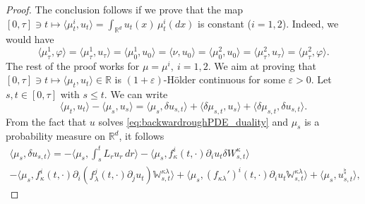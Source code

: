 \documentclass[10pt, a4paper]{article} %
\newcommand{\R}{\mathbb{R}}
\theoremstyle{definition}
\theoremstyle{plain}
\begin{document}
\begin{proof}

    The conclusion follows if we prove that the map $[0,\tau] \ni t \mapsto \langle \mu^i_t, u_t \rangle = \int_{\R^d} u_t(x) \, \mu^i_t(dx)$ is constant ($i=1,2$). Indeed, we would have \begin{equation*}
        \langle \mu^1_\tau , \varphi \rangle = \langle \mu^1_\tau , u_\tau \rangle = \langle \mu^1_0 , u_0 \rangle = \langle \nu , u_0 \rangle = \langle \mu^2_0 , u_0 \rangle = \langle \mu^2_\tau , u_\tau \rangle = \langle \mu^2_\tau , \varphi \rangle .
    \end{equation*}
    The rest of the proof works for $\mu=\mu^i, \ i=1,2$. 
    We aim at proving that $[0,\tau] \ni t \mapsto \langle \mu_t, u_t \rangle \in \R$ is $(1+\varepsilon)$-H\"older continuous for some $\varepsilon >0$. 
    Let $s,t \in [0,\tau]$ with $s \le t$.  We can write \begin{equation*}
        \langle \mu_t, u_t \rangle - \langle \mu_s, u_s \rangle = \langle \mu_s, \delta u_{s,t} \rangle + \langle \delta \mu_{s,t}, u_s \rangle + \langle \delta \mu_{s,t}, \delta u_{s,t} \rangle .
    \end{equation*}
    From the fact that $u$ solves \eqref{eq:backwardroughPDE_duality} and $\mu_s$ is a probability measure on $\R^d$, it follows
    \begin{multline*}
        \langle \mu_s, \delta u_{s,t} \rangle = - \langle \mu_s , \int_s^t  L_r u_r \, dr \rangle - \langle \mu_s , f_\kappa^i(t,\cdot) \partial_i u_t \delta W^\kappa_{s,t} \rangle   \\ 
        - \langle \mu_s, f^i_\kappa(t,\cdot) \partial_i(f^j_\lambda(t,\cdot) \partial_j u_t) \mathbb{W}^{\kappa\lambda}_{s,t} \rangle  +  \langle \mu_s, (f_{\kappa\lambda}')^i(t,\cdot) \partial_i u_t \mathbb{W}^{\kappa\lambda}_{s,t} \rangle  + \langle \mu_s, u^\natural_{s,t} \rangle ,
    \end{multline*}

\end{proof}
\end{document}
